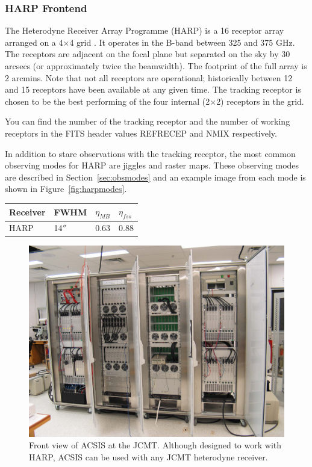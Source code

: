 \documentclass[twoside,11pt]{article}
\newcommand{\htmlref}[2]{#1}
\newcommand{\latexhtml}[2]{#1}
\newcommand{\xlabel}[1]{}
\renewcommand{\_}{\texttt{\symbol{95}}}
\newcommand{\cref}[3]{\latexhtml{#1~\ref{#2}}{\htmlref{#3}{#2}}}
\begin{document}
\subsubsection{\xlabel{harp}HARP Frontend}
The Heterodyne Receiver Array Programme (HARP) is a 16 receptor array arranged on a 4$\times$4 grid \cite{harp}. It operates in the B-band between 325 and 375 GHz. The receptors are adjacent on the focal plane but separated on the sky by 30 arcsecs (or approximately twice the beamwidth). The footprint of the full array is 2 arcmins. Note that not all receptors are operational; historically between 12 and 15 receptors have been available at any given time. The tracking receptor is chosen to be the best performing of the four internal (2$\times$2) receptors in the grid.

You can find the number of the tracking receptor and the number of working receptors in the FITS header values REFRECEP and N\_MIX respectively.

In addition to stare observations with the tracking receptor, the most common observing modes for HARP are jiggles and raster maps. These observing modes are described in \cref{Section}{sec:obsmodes}{Observing modes} and an example image from each mode is shown in \cref{Figure}{fig:harpmodes}{the figure below}.

\begin{table}[h!]
\begin{center}
\begin{tabular}{|p{1.5cm}|p{1.2cm}|p{0.8cm}|p{0.8cm}|}
\hline
Receiver &FWHM & $\eta_{MB}$ & $\eta_{fss}$\\
\hline
HARP&14$''$ &0.63& 0.88\\
\hline
\end{tabular}
\end{center}
\end{table}


\begin{figure}[b!]
\begin{center}
\includegraphics[width=0.7\linewidth]{sc20_acsis_front_sm}
\caption[Front view of ACSIS at the JCMT]{Front view of ACSIS at the JCMT. Although designed to work with HARP, ACSIS can be used with any JCMT heterodyne receiver.}
\label{fig:acsis}
\end{center}
\end{figure}
\end{document}
